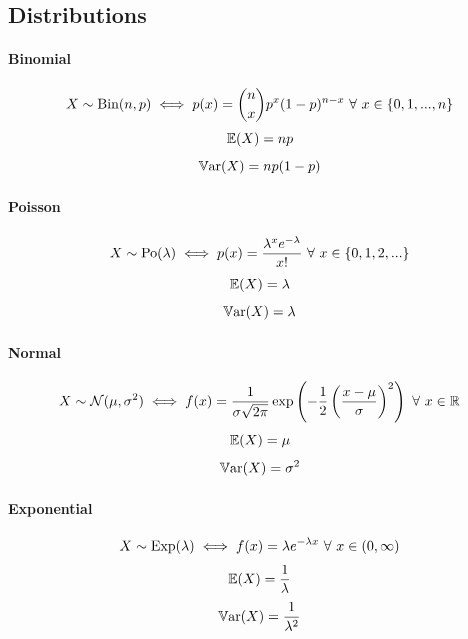 \documentclass[a4paper]{article}
\begin{document}
        \subsection*{Distributions}
            \paragraph{Binomial}
                \[
                    X \sim \text{Bin}(n, p) \iff p(x) = {n\choose x} p^x (1 -
                    p)^{n - x} \,\,\forall\,\, x \in \{0, 1, ..., n\}
                \]
                \[
                    \mathbb{E}(X) = np
                \]
                \[
                    \mathbb{V}\text{ar}(X) = np(1 - p)
                \]

            \paragraph{Poisson}
                \[
                    X \sim \text{Po}(\lambda) \iff p(x) = \frac{\lambda^x
                    e^{-\lambda}}{x!} \,\,\forall\,\, x \in \{0, 1, 2, ...\}
                \]
                \[
                    \mathbb{E}(X) = \lambda
                \]
                \[
                    \mathbb{V}\text{ar}(X) = \lambda
                \]

            \paragraph{Normal}
                \[
                    X \sim \mathcal{N}(\mu, \sigma^2) \iff f(x) =
                    \frac{1}{\sigma\sqrt{2\pi}} \exp\left(-\frac{1}{2}\left(
                    \frac{x - \mu}{\sigma}\right)^2\right) \,\,\forall\,\, x \in \mathbb{R}
                \]
                \[
                    \mathbb{E}(X) = \mu
                \]
                \[
                    \mathbb{V}\text{ar}(X) = \sigma^2
                \]

            \paragraph{Exponential}
                \[
                    X \sim \text{Exp}(\lambda) \iff f(x) = \lambda e^{-\lambda
                    x} \,\,\forall\,\, x \in (0, \infty)
                \]
                \[
                    \mathbb{E}(X) = \frac{1}{\lambda}
                \]
                \[
                    \mathbb{V}\text{ar}(X) = \frac{1}{\lambda^2}
                \]
\end{document}
